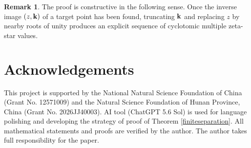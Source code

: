 \documentclass[12pt,a4paper]{amsart}
\numberwithin{equation}{section}
\theoremstyle{plain}
\theoremstyle{definition}
\newtheorem{rem}[Thm]{Remark}
\begin{document}
\begin{rem}
The proof is constructive in the following sense.  Once the inverse image $(z,{\bf k})$ of a target point has been found, truncating ${\bf k}$ and replacing $z$ by nearby roots of unity produces an explicit sequence of cyclotomic multiple zeta-star values. \end{rem}

\section*{Acknowledgements}

 This project is  supported  by the National Natural Science Foundation of China (Grant No. 12571009) and the Natural Science Foundation of Hunan Province, China (Grant No. 2026JJ40003).     AI tool (ChatGPT 5.6 Sol) is used for language polishing and developing  the strategy of proof  of Theorem \ref{finiteseparation}. All mathematical statements and proofs  are verified by the author.  The author takes full responsibility for the paper.
 
\end{document}
